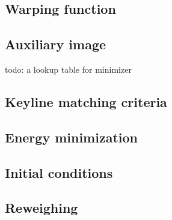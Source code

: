 
\subsection{Warping function}

\subsection{Auxiliary image}

todo: a lookup table for minimizer

\subsection{Keyline matching criteria}


\subsection{Energy minimization}

\subsection{Initial conditions}

\subsection{Reweighing}

